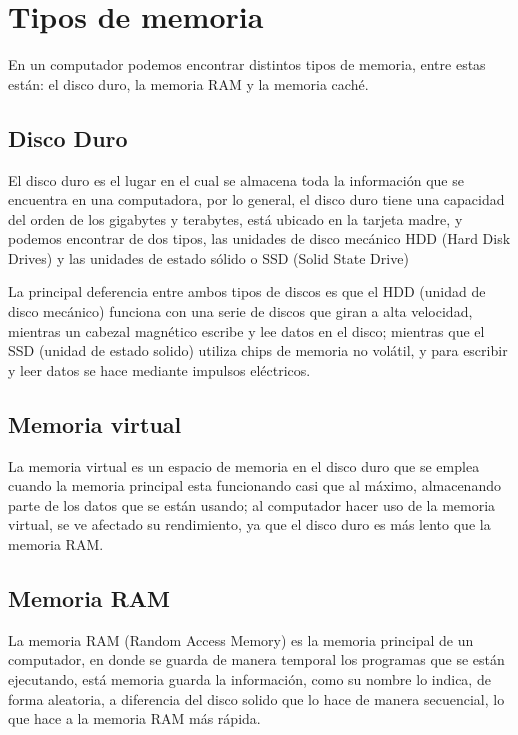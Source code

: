 \documentclass{article}
\begin{document}
\section{Tipos de memoria} \label{contenido}
En un computador podemos encontrar distintos tipos de memoria, entre estas están: el disco duro, la memoria RAM y la memoria caché.

\subsection{Disco Duro}
El disco duro es el lugar en el cual se almacena toda la información que se encuentra en una computadora, por lo general, el disco duro tiene una capacidad del orden de los gigabytes y terabytes, está ubicado en la tarjeta madre, y podemos encontrar de dos tipos, las unidades de disco mecánico HDD (Hard Disk Drives) y las unidades de estado sólido o SSD (Solid State Drive)
\vspace{0.5cm}

La principal deferencia entre ambos tipos de discos es que el HDD (unidad de disco mecánico) funciona con una serie de discos que giran a alta velocidad, mientras un cabezal magnético escribe y lee datos en el disco\cite{andres2017cual}; mientras que el SSD (unidad de estado solido) utiliza chips de memoria no volátil, y para escribir y leer datos se hace mediante impulsos eléctricos.\cite{andres2017cual}

\subsection{Memoria virtual}
La memoria virtual es un espacio de memoria en el disco duro que se emplea cuando la memoria principal esta funcionando casi que al máximo, almacenando parte de los datos que se están usando; al computador hacer uso de la memoria virtual, se ve afectado su rendimiento, ya que el disco duro es más lento que la memoria RAM.\cite{rebollo2011memoria}

\subsection{Memoria RAM}
La memoria RAM (Random Access Memory) es la memoria principal de un computador, en donde se guarda de manera temporal los programas que se están ejecutando, está memoria  guarda la información, como su nombre lo indica, de forma aleatoria, a diferencia del disco solido que lo hace de manera secuencial, lo que hace a la memoria RAM más rápida.\cite{rebollo2011memoria}
\end{document}
